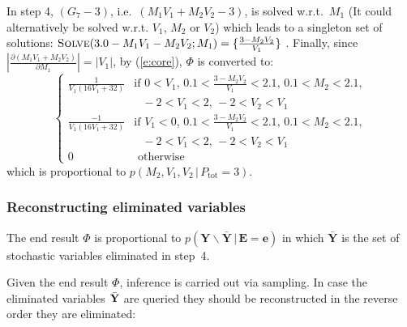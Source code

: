 \documentclass[]{article}
\newcommand{\bvec}[1]{\textbf{#1}}
\newcommand{\otherwise}[1]{#1 &\text{ otherwise}}
\newcommand{\pr}{p}
\begin{document}
In step 4, 
{\footnotesize$(G_7 - 3)$}, i.e.\ 
{\footnotesize$(M_1 V_1 + M_2 V_2 - 3)$}, is solved w.r.t.\ 
{\footnotesize$M_1$} (It could alternatively be solved w.r.t. 
{\footnotesize$V_1$}, 
{\footnotesize$M_2$} or 
{\footnotesize$V_2$})
which leads to a singleton set of solutions:
{\footnotesize
$\textsc{Solve}(3.0 - M_1 V_1 - M_2 V_2; M_1) = \{\frac{3 - M_2 V_2}{V_1}\}$
}.
Finally, since  
{\footnotesize$\left| \frac{\partial (M_1 V_1 + M_2 V_2)}{\partial M_1} \right| = |V_1|$}, by (\ref{e:core}),
{\footnotesize$\Phi$} is converted to:  
{\footnotesize
\begin{equation}  
\label{e:col-prior2}
\begin{cases}
\frac{1}{V_1(16 V_1 + 32)} &{\text{if }\scriptstyle 0<V_1, \, 0.1<\frac{3-M_2 V_2}{V_1}<2.1, \, 0.1<M_2<2.1,}\\
							 &{\;\;\, \scriptstyle -2<V_1<2, \, -2<V_2 < V_1}\\
\frac{-1}{V_1(16 V_1 + 32)} &{\text{if }\scriptstyle V_1<0, \, 0.1<\frac{3-M_2 V_2}{V_1}<2.1, \, 0.1<M_2<2.1,}\\
							 &{\;\;\, \scriptstyle -2<V_1<2, \, -2<V_2 < V_1}\\
 \otherwise{0}
 \end{cases}
\end{equation}
}
which is proportional to $\pr(M_2, V_1, V_2 \,|\, P_\text{tot} = 3)$.

\subsubsection*{Reconstructing eliminated variables}

The end result $\Phi$ is proportional to 
$\pr(\bvec{Y}\backslash \bar{\bvec{Y}} \,|\, \bvec{E} = \bvec{e})$ in which 
$\bar{\bvec{Y}}$ is the set of stochastic variables eliminated in
step~4.

Given the end result ${\Phi}$, inference is carried out via sampling.
In case the eliminated variables $\bar{\bf Y}$ are queried they should be reconstructed in the reverse order they are eliminated:
\end{document}
